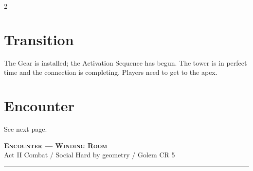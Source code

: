 \documentclass[10pt,letterpaper]{article}
\newcommand{\sceneheader}[4]{%
  \fancyhead[L]{\small\textcolor{accent}{\scshape #1}}%
  \fancyhead[R]{\small\textcolor{accent}{#2 \quad \textbullet \quad #3}}%
  \begin{center}
  {\LARGE\bfseries\scshape\textcolor{accent}{#1}}\\[2pt]
  {\small #2 \quad \textbullet \quad #3 \quad \textbullet \quad #4}\\[2pt]
  \textcolor{rulecol}{\rule{0.5\textwidth}{0.8pt}}
  \end{center}
  \vspace{-4pt}
}
\begin{document}
\begin{multicols}{2}
\section*{Transition}
The Gear is installed; the Activation Sequence has begun. The tower is in perfect time and the connection is completing. Players need to get to the apex.

\section*{Encounter}
See next page.

\end{multicols}

\newpage


\label{sec:enc-gearroom}\sceneheader{Encounter --- Winding Room}{Act II}{Combat / Social}{Hard by geometry / Golem CR 5}
\end{document}
